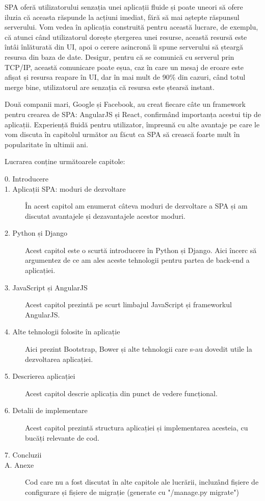 SPA oferă utilizatorului senzația unei
aplicații fluide și poate uneori să ofere iluzia că aceasta răspunde la acțiuni
imediat, fără să mai aștepte răspunsul serverului. Vom vedea în aplicația
construită pentru această lucrare, de exemplu, că atunci când utilizatorul
dorește ștergerea unei resurse, această resursă este întâi înlăturată din UI,
apoi o cerere asincronă îi spune serverului să șteargă resursa din baza de date.
Desigur, pentru că se comunică cu serverul prin TCP/IP, această comunicare
poate eșua, caz în care un mesaj de eroare este afișat și resursa reapare în UI,
dar în mai mult de 90\% din cazuri, când totul merge bine, utilizatorul are
senzația că resursa este ștearsă instant.

Două companii mari, Google și Facebook,
au creat fiecare  câte un framework pentru crearea de SPA: AngularJS și React,
confirmând importanța acestui tip de aplicații. Experiență fluidă pentru utilizator, împreună cu alte avantaje pe care le
vom discuta în capitolul următor au făcut ca SPA să crească foarte mult în popularitate
în ultimii ani.

Lucrarea conține următoarele capitole:

\begin{description}
\item [0. Introducere]
\item [1. Aplicații SPA: moduri de dezvoltare] În acest capitol
  am enumerat câteva moduri de dezvoltare a SPA și am discutat
  avantajele și dezavantajele acestor moduri.
\item [2. Python și Django] Acest capitol este o scurtă introducere
  în Python și Django. Aici încerc să argumentez de ce am ales
  aceste tehnologii pentru partea de back-end a aplicației.
\item [3. JavaScript și AngularJS] Acest capitol prezintă pe scurt
  limbajul JavaScript și frameworkul AngularJS.
\item [4. Alte tehnologii folosite în aplicație] Aici prezint
  Bootstrap, Bower și alte tehnologii care s-au dovedit utile
  la dezvoltarea aplicației.
\item [5. Descrierea aplicației] Acest capitol descrie aplicația
  din punct de vedere funcțional.
\item [6. Detalii de implementare] Acest capitol prezintă structura
  aplicației și implementarea acesteia, cu bucăți relevante de cod.
\item [7. Concluzii]
\item [A. Anexe] Cod care nu a fost discutat în alte capitole ale lucrării,
  incluzând fișiere de configurare și fișiere de migrație (generate
  cu "/manage.py migrate")
\end{description}